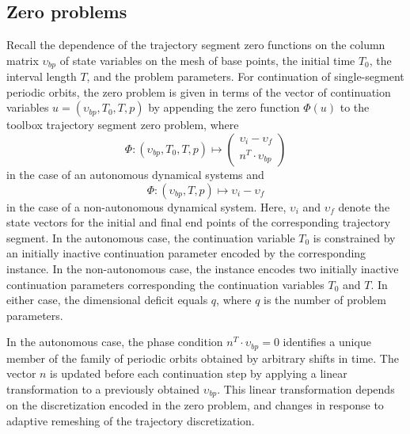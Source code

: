 \subsection{Zero problems}
Recall the dependence of the  trajectory segment zero functions on the column matrix $\upsilon_{bp}$ of state variables on the mesh of base points, the initial time $T_0$, the interval length $T$, and the problem parameters. For continuation of single-segment periodic orbits, the zero problem is given in terms of the vector of continuation variables $u=(\upsilon_{bp},T_0,T,p)$ by appending the zero function $\Phi(u)$ to the  toolbox trajectory segment zero problem, where
\begin{equation}
\Phi:\left(\upsilon_{bp}, T_0,T, p\right)\mapsto\left(\begin{array}{c}
\upsilon_i-\upsilon_f\\n^T\cdot \upsilon_{bp}
\end{array}\right)
\end{equation}
in the case of an autonomous dynamical systems and
\begin{equation}
\Phi:\left(\upsilon_{bp}, T, p\right)\mapsto\upsilon_i-\upsilon_f
\end{equation}
in the case of a non-autonomous dynamical system. Here, $\upsilon_i$ and $\upsilon_f$ denote the state vectors for the initial and final end points of the corresponding trajectory segment. In the autonomous case, the continuation variable $T_0$ is constrained by an initially inactive continuation parameter encoded by the corresponding  instance. In the non-autonomous case, the  instance encodes two initially inactive continuation parameters corresponding the continuation variables $T_0$ and $T$. In either case, the dimensional deficit equals $q$, where $q$ is the number of problem parameters.

In the autonomous case, the phase condition $n^T\cdot\upsilon_{bp}=0$ identifies a unique member of the family of periodic orbits obtained by arbitrary shifts in time. The vector $n$ is updated before each continuation step by applying a linear transformation to a previously obtained $\upsilon_{bp}$. This linear transformation depends on the discretization encoded in the  zero problem, and changes in response to adaptive remeshing of the trajectory discretization.

